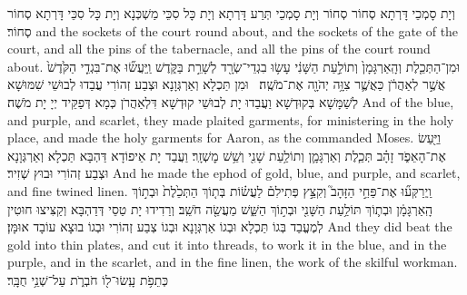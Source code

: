 {וְיָת סָמְכֵי דָּרְתָא סְחוֹר סְחוֹר וְיָת סָמְכֵי תְּרַע דָּרְתָא וְיָת כָּל סִכֵּי מַשְׁכְּנָא וְיָת כָּל סִכֵּי דָּרְתָא סְחוֹר סְחוֹר׃}
{and the sockets of the court round about, and the sockets of the gate of the court, and all the pins of the tabernacle, and all the pins of the court round about.}{}
\newperek
{}%
{וּמִן־הַתְּכֵ֤לֶת וְהָֽאַרְגָּמָן֙ וְתוֹלַ֣עַת הַשָּׁנִ֔י עָשׂ֥וּ בִגְדֵי־שְׂרָ֖ד לְשָׁרֵ֣ת בַּקֹּ֑דֶשׁ וַֽיַּעֲשׂ֞וּ אֶת־בִּגְדֵ֤י הַקֹּ֙דֶשׁ֙ אֲשֶׁ֣ר לְאַהֲרֹ֔ן כַּאֲשֶׁ֛ר צִוָּ֥ה יְהֹוָ֖ה אֶת־מֹשֶֽׁה׃ \petucha 
{}}
{וּמִן תַּכְלָא וְאַרְגְּוָנָא וּצְבַע זְהוֹרִי עֲבַדוּ לְבוּשֵׁי שִׁמּוּשָׁא לְשַׁמָּשָׁא בְּקוּדְשָׁא וַעֲבַדוּ יָת לְבוּשֵׁי קוּדְשָׁא דִּלְאַהֲרֹן כְּמָא דְּפַקֵּיד יְיָ יָת מֹשֶׁה׃}
{And of the blue, and purple, and scarlet, they made plaited garments, for ministering in the holy place, and made the holy garments for Aaron, as the \lord\space commanded Moses.}{}
{וַיַּ֖עַשׂ אֶת־הָאֵפֹ֑ד זָהָ֗ב תְּכֵ֧לֶת וְאַרְגָּמָ֛ן וְתוֹלַ֥עַת שָׁנִ֖י וְשֵׁ֥שׁ מׇשְׁזָֽר׃}
{וַעֲבַד יָת אֵיפוֹדָא דַּהְבָּא תַּכְלָא וְאַרְגְּוָנָא וּצְבַע זְהוֹרִי וּבוּץ שְׁזִיר׃}
{And he made the ephod of gold, blue, and purple, and scarlet, and fine twined linen.}{}
{וַֽיְרַקְּע֞וּ אֶת־פַּחֵ֣י הַזָּהָב֮ וְקִצֵּ֣ץ פְּתִילִם֒ לַעֲשׂ֗וֹת בְּת֤וֹךְ הַתְּכֵ֙לֶת֙ וּבְת֣וֹךְ הָֽאַרְגָּמָ֔ן וּבְת֛וֹךְ תּוֹלַ֥עַת הַשָּׁנִ֖י וּבְת֣וֹךְ הַשֵּׁ֑שׁ מַעֲשֵׂ֖ה חֹשֵֽׁב׃
}
{וְרַדִידוּ יָת טַסֵי דְּדַהְבָּא וְקַצִּיצוּ חוּטִין לְמֶעֱבַד בְּגוֹ תַּכְלָא וּבְגוֹ אַרְגְּוָנָא וּבְגוֹ צְבַע זְהוֹרִי וּבְגוֹ בוּצָא עוֹבָד אוּמָּן׃}
{And they did beat the gold into thin plates, and cut it into threads, to work it in the blue, and in the purple, and in the scarlet, and in the fine linen, the work of the skilful workman.}{}
{כְּתֵפֹ֥ת עָֽשׂוּ־ל֖וֹ חֹבְרֹ֑ת עַל־שְׁנֵ֥י  חֻבָּֽר׃}
